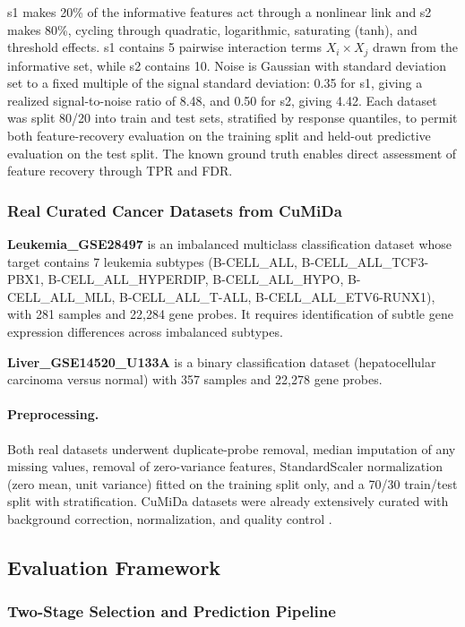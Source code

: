 \documentclass[11pt]{article}
\begin{document}
s1 makes 20\% of the informative features act through a nonlinear link and s2 makes 80\%, cycling
through quadratic, logarithmic, saturating (tanh), and threshold effects. s1 contains 5 pairwise
interaction terms $X_i \times X_j$ drawn from the informative set, while s2 contains 10. Noise is
Gaussian with standard deviation set to a fixed multiple of the signal standard deviation: 0.35 for
s1, giving a realized signal-to-noise ratio of 8.48, and 0.50 for s2, giving 4.42. Each dataset was
split 80/20 into train and test sets, stratified by response quantiles, to permit both
feature-recovery evaluation on the training split and held-out predictive evaluation on the test
split. The known ground truth enables direct assessment of feature recovery through TPR and FDR.

\subsubsection{Real Curated Cancer Datasets from CuMiDa}

\textbf{Leukemia\_GSE28497} is an imbalanced multiclass classification dataset whose target contains
7 leukemia subtypes (B-CELL\_ALL, B-CELL\_ALL\_TCF3-PBX1, B-CELL\_ALL\_HYPERDIP,
B-CELL\_ALL\_HYPO, B-CELL\_ALL\_MLL, B-CELL\_ALL\_T-ALL, B-CELL\_ALL\_ETV6-RUNX1), with 281 samples
and 22{,}284 gene probes. It requires identification of subtle gene expression differences across
imbalanced subtypes.

\textbf{Liver\_GSE14520\_U133A} is a binary classification dataset (hepatocellular carcinoma versus
normal) with 357 samples and 22{,}278 gene probes.

\paragraph{Preprocessing.} Both real datasets underwent duplicate-probe removal, median imputation of
any missing values, removal of zero-variance features, StandardScaler normalization (zero mean, unit
variance) fitted on the training split only, and a 70/30 train/test split with stratification. CuMiDa
datasets were already extensively curated with background correction, normalization, and quality
control \citep{feltes2019}.

\subsection{Evaluation Framework}

\subsubsection{Two-Stage Selection and Prediction Pipeline}
\end{document}
